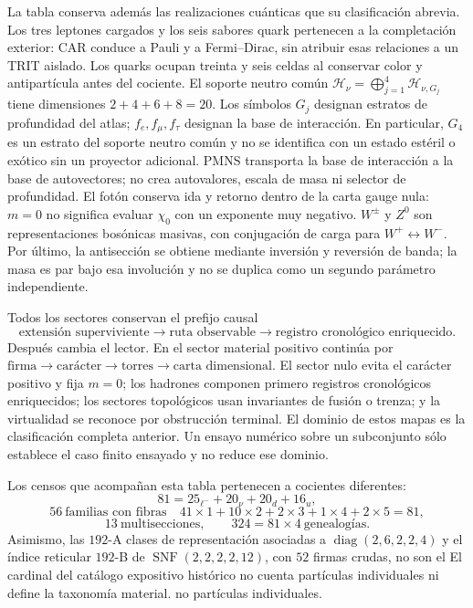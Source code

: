 
La tabla conserva además las realizaciones cuánticas que su clasificación
abrevia. Los tres leptones cargados y los seis sabores quark pertenecen a la
completación exterior: CAR conduce a Pauli y a Fermi--Dirac, sin atribuir esas
relaciones a un TRIT aislado. Los quarks ocupan treinta y seis celdas al
conservar color y antipartícula antes del cociente. El soporte neutro común
\(\mathcal H_\nu=\bigoplus_{j=1}^{4}\mathcal H_{\nu,G_j}\) tiene dimensiones
\(2+4+6+8=20\). Los símbolos \(G_j\) designan estratos de profundidad del atlas;
\(f_e,f_\mu,f_\tau\) designan la base de interacción. En particular, \(G_4\) es
un estrato del soporte neutro común y no se identifica con un estado estéril o
exótico sin un proyector adicional. PMNS transporta la base de interacción a la
base de autovectores; no crea autovalores, escala de masa ni selector de
profundidad. El fotón conserva ida y retorno dentro de la
carta gauge nula: \(m=0\) no significa evaluar \(\chi_0\) con un exponente muy
negativo. \(W^\pm\) y \(Z^0\) son representaciones bosónicas masivas, con
conjugación de carga para \(W^+\leftrightarrow W^-\). Por último, la
antisección se obtiene mediante inversión y reversión de banda; la masa es par
bajo esa involución y no se duplica como un segundo parámetro independiente.

Todos los sectores conservan el prefijo causal
\[
\text{extensión superviviente}\longrightarrow\text{ruta observable}
\longrightarrow\text{registro cronológico enriquecido}.
\]
Después cambia el lector. En el sector material positivo continúa por
\(\text{firma}\to\text{carácter}\to\text{torres}\to\text{carta dimensional}\).
El sector nulo evita el carácter positivo y fija \(m=0\); los hadrones componen
primero registros cronológicos enriquecidos; los sectores topológicos usan invariantes de
fusión o trenza; y la virtualidad se reconoce por obstrucción terminal. El
dominio de estos mapas es la clasificación completa anterior. Un ensayo
numérico sobre un subconjunto sólo establece el caso finito ensayado y no
reduce ese dominio.

Los censos que acompañan esta tabla pertenecen a cocientes diferentes:
\[
81=25_{\ell^-}+20_\nu+20_d+16_u,
\]
\[
56\ \text{familias con fibras}\quad
41\times1+10\times2+2\times3+1\times4+2\times5=81,
\]
\[
13\ \text{multisecciones},\qquad324=81\times4\ \text{genealogías}.
\]
Asimismo, las \(192\)-A clases de representación asociadas a
\(\operatorname{diag}(2,6,2,2,4)\) y el índice reticular \(192\)-B de
\(\operatorname{SNF}(2,2,2,2,12)\), con \(52\) firmas crudas, no son el
El cardinal del catálogo expositivo histórico no cuenta partículas individuales ni define la taxonomía material.
no partículas individuales.
